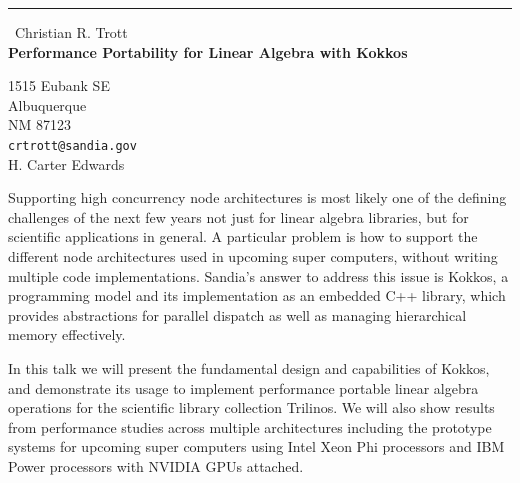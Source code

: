 \documentclass{report}
\begin{document}
\begin{center}
\rule{6in}{1pt} \
{\large Christian R. Trott \\
{\bf Performance Portability for Linear Algebra with Kokkos}}

1515 Eubank SE \\ Albuquerque \\ NM 87123
\\
{\tt crtrott@sandia.gov}\\
H. Carter Edwards\end{center}

Supporting high concurrency node architectures is most likely one of the
defining challenges of the next few years not just for linear algebra
libraries, but for scientific applications in general. A particular
problem is how to support the different node architectures used in
upcoming super computers, without writing multiple code implementations.
Sandia's answer to address this issue is Kokkos, a programming model and
its implementation as an embedded C++ library, which provides
abstractions for parallel dispatch as well as managing hierarchical
memory effectively.

In this talk we will present the fundamental design and capabilities of
Kokkos, and demonstrate its usage to implement performance portable
linear algebra operations for the scientific library collection Trilinos.
We will also show results from performance studies across multiple
architectures including the prototype systems for upcoming super
computers using Intel Xeon Phi processors and IBM Power processors with
NVIDIA GPUs attached.
\end{document}
